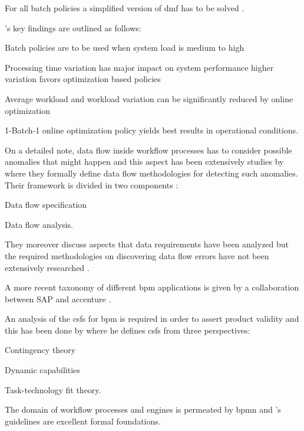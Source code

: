 For all batch policies a simplified version of \gls{dmf} has to be solved \citep{Zeng2005}.

\citet{Zeng2005}'s key findings are outlined as follows:
\begin{enumerate*}
	\item Batch policies are to be used when system load is medium to high
	\item Processing time variation has major impact on system performance \ie higher variation favors optimization based policies
	\item Average workload and workload variation can be significantly reduced by online optimization
	\item 1-Batch-1 online optimization policy yields best results in operational conditions.
\end{enumerate*}

On a detailed note, data flow inside workflow processes has to consider possible anomalies that might happen and this aspect has been extensively studies by \citet{Sun2006} where they formally define data flow methodologies for detecting such anomalies. Their framework is divided in two components \citep{Sun2006}:
\begin{enumerate*}
	\item Data flow specification
	\item Data flow analysis.
\end{enumerate*}

They moreover discuss aspects that data requirements have been analyzed but the required methodologies on discovering data flow errors have not been extensively researched \citep{Sun2006}.

A more recent taxonomy of different \gls{bpm} applications is given by a collaboration between SAP and accenture \citep{EvolvedTechnologist2009}.

An analysis of the \glspl{csf} for \gls{bpm} is required in order to assert product validity and this has been done by \citet{Trkman2010} where he defines \glspl{csf} from three perspectives:
\begin{enumerate*}
	\item Contingency theory
	\item Dynamic capabilities
	\item Task-technology fit theory.
\end{enumerate*}

The domain of workflow processes and engines is permeated by \gls{bpmn} and \citet{Silver2011}'s guidelines are excellent formal foundations.

